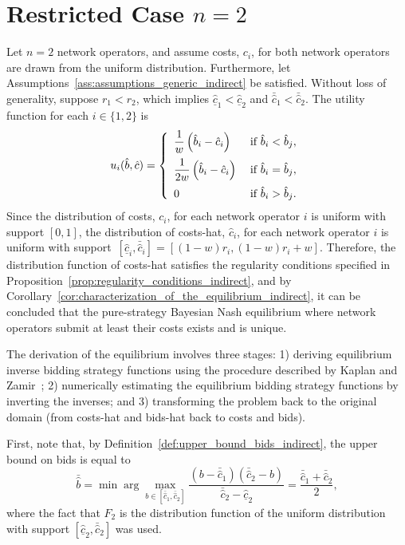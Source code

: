 \section{Restricted Case $n=2$} %
\label{sec:restricted_case_n_2_indirect}
Let $n=2$ network operators, and assume costs, $c_i$, for both network operators are drawn from the uniform distribution. Furthermore, let Assumptions~\ref{ass:assumptions_generic_indirect} be satisfied. Without loss of generality, suppose $r_1 < r_2$, which implies $\underline{\hat{c}}_1 < \underline{\hat{c}}_2$ and $\bar{\hat{c}}_1 < 
\bar{\hat{c}}_2$. The utility function for each $i\in \{1,2\}$ is
\begin{equation}
  u_i(\hat{b},\hat{c}) = \left\{
  \begin{array}{l l}
    \displaystyle\frac{1}{w}\left(\hat{b}_i-\hat{c}_i\right) & \;\textrm{if } \hat{b}_i < \hat{b}_j,\\[2ex]
    \displaystyle\frac{1}{2w}\left(\hat{b}_i-\hat{c}_i\right) & \;\textrm{if } \hat{b}_i = \hat{b}_j,\\[2ex]
    0 & \;\textrm{if } \hat{b}_i > \hat{b}_j.
  \end{array}\right.
\end{equation}
Since the distribution of costs, $c_i$, for each network operator $i$ is uniform with support $[0,1]$, the distribution of costs-hat, $\hat{c}_i$, for each network operator $i$ is uniform with support~${[\underline{\hat{c}}_i, \bar{\hat{c}}_i]} = {[(1-w)r_i, (1-w)r_i + w]}$. Therefore, the distribution function of costs-hat satisfies the regularity conditions specified in Proposition~\ref{prop:regularity_conditions_indirect}, and by Corollary~\ref{cor:characterization_of_the_equilibrium_indirect}, it can be concluded that the pure-strategy Bayesian Nash equilibrium where network operators submit at least their costs exists and is unique.

The derivation of the equilibrium involves three stages: 1) deriving equilibrium inverse bidding strategy functions using the procedure described by Kaplan and Zamir~\cite{KaplanZamir2007}; 2) numerically estimating the equilibrium bidding strategy functions by inverting the inverses; and 3) transforming the problem back to the original domain (from costs-hat and bids-hat back to costs and bids).

First, note that, by Definition~\ref{def:upper_bound_bids_indirect}, the upper bound on bids is equal to
\begin{equation}
  \label{eq:upper_bound_bids_restricted_indirect}
  \bar{\hat{b}} = \min\arg\max_{b\in[\bar{\hat{c}}_1, \bar{\hat{c}}_2]} \frac{(b - \bar{\hat{c}}_1)(\bar{\hat{c}}_2 - b)}{\bar{\hat{c}}_2 - \underline{\hat{c}}_2} = \frac{\bar{\hat{c}}_1 + \bar{\hat{c}}_2}{2},
\end{equation}
where the fact that $F_2$ is the distribution function of the uniform distribution with support $[\underline{\hat{c}}_2, \bar{\hat{c}}_2]$ was used.

